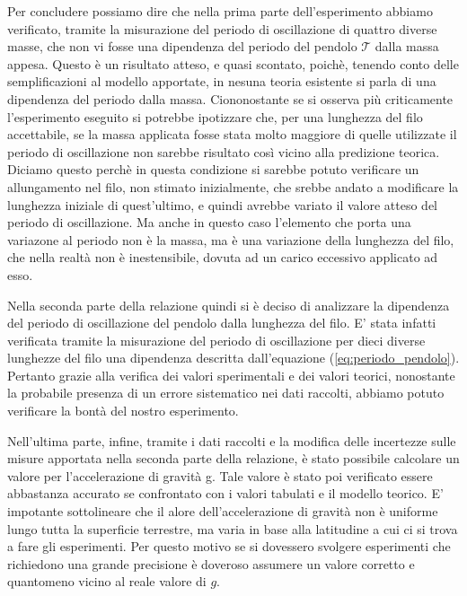 Per concludere possiamo dire che nella prima parte dell'esperimento abbiamo verificato, tramite la misurazione del periodo di oscillazione di quattro diverse masse, che non vi fosse una dipendenza del periodo del pendolo $\mathcal{T}$ dalla massa appesa. Questo è un risultato atteso, e quasi scontato, poichè, tenendo conto delle semplificazioni al modello apportate, in nesuna teoria esistente si parla di una dipendenza del periodo dalla massa. Ciononostante se si osserva più criticamente l'esperimento eseguito si potrebbe ipotizzare che, per una lunghezza del filo accettabile, se la massa applicata fosse stata molto maggiore di quelle utilizzate il periodo di oscillazione non sarebbe risultato così vicino alla predizione teorica. Diciamo questo perchè in questa condizione si sarebbe potuto verificare un allungamento nel filo, non stimato inizialmente, che srebbe andato a modificare la lunghezza iniziale di quest'ultimo, e quindi avrebbe variato il valore atteso del periodo di oscillazione. Ma anche in questo caso l'elemento che porta una variazone al periodo non è la massa, ma è una variazione della lunghezza del filo, che nella realtà non è inestensibile, dovuta ad un carico eccessivo applicato ad esso.

Nella seconda parte della relazione quindi si è deciso di analizzare la dipendenza del periodo di oscillazione del pendolo dalla lunghezza del filo. E' stata infatti verificata tramite la misurazione del periodo di oscillazione per dieci diverse lunghezze del filo una dipendenza descritta dall'equazione (\ref{eq:periodo_pendolo}). Pertanto grazie alla verifica dei valori sperimentali e dei valori teorici, nonostante la probabile presenza di un errore sistematico nei dati raccolti, abbiamo potuto verificare la bontà del nostro esperimento.

Nell'ultima parte, infine, tramite i dati raccolti e la modifica delle incertezze sulle misure apportata nella seconda parte della relazione, è stato possibile calcolare un valore per l'accelerazione di gravità g. Tale valore è stato poi verificato essere abbastanza accurato se confrontato con i valori tabulati e il modello teorico. E' impotante sottolineare che il alore dell'accelerazione di gravità non è uniforme lungo tutta la superficie terrestre, ma varia in base alla latitudine a cui ci si trova a fare gli esperimenti. Per questo motivo se si dovessero svolgere esperimenti che richiedono una grande precisione è doveroso assumere un valore corretto e quantomeno vicino al reale valore di $g$.